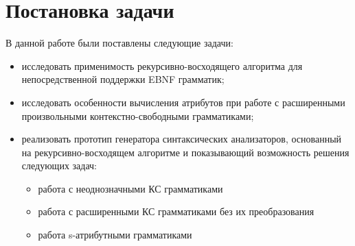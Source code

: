 \section{Постановка задачи}

В данной работе были поставлены следующие задачи:
\begin{itemize}
	\item исследовать применимость рекурсивно-восходящего алгоритма для непосредственной поддержки EBNF грамматик;
	\item исследовать особенности вычисления атрибутов при работе с расширенными произвольными контекстно-свободными грамматиками;
	\item реализовать прототип генератора синтаксических анализаторов, основанный на рекурсивно-восходящем алгоритме и показывающий возможность решения следующих задач:
		\begin{itemize}
		  \item работа с неоднозначными КС грамматиками
			\item работа с расширенными КС грамматиками без их преобразования
			\item работа s-атрибутными грамматиками
		\end{itemize}
\end{itemize}
